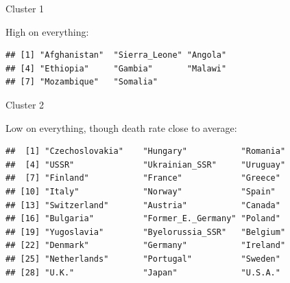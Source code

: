\begin{frame}[fragile]{Cluster 1}

    High on everything:

  
\begin{knitrout}
\color{fgcolor}\begin{kframe}
\begin{alltt}
\hlstd{(vital.s,country[clus6}\hlopt{==}\hlstd{])}
\end{alltt}
\begin{verbatim}
## [1] "Afghanistan"  "Sierra_Leone" "Angola"      
## [4] "Ethiopia"     "Gambia"       "Malawi"      
## [7] "Mozambique"   "Somalia"
\end{verbatim}
\end{kframe}
\end{knitrout}
  
\end{frame}
\begin{frame}[fragile]{Cluster 2}

  Low on everything, though death rate close to average:
  
\begin{knitrout}\small
{}\color{fgcolor}\begin{kframe}
\begin{alltt}
\hlstd{(vital.s,country[clus6}\hlopt{==}\hlstd{])}
\end{alltt}
\begin{verbatim}
##  [1] "Czechoslovakia"    "Hungary"           "Romania"          
##  [4] "USSR"              "Ukrainian_SSR"     "Uruguay"          
##  [7] "Finland"           "France"            "Greece"           
## [10] "Italy"             "Norway"            "Spain"            
## [13] "Switzerland"       "Austria"           "Canada"           
## [16] "Bulgaria"          "Former_E._Germany" "Poland"           
## [19] "Yugoslavia"        "Byelorussia_SSR"   "Belgium"          
## [22] "Denmark"           "Germany"           "Ireland"          
## [25] "Netherlands"       "Portugal"          "Sweden"           
## [28] "U.K."              "Japan"             "U.S.A."
\end{verbatim}
\end{kframe}
\end{knitrout}
  
\end{frame}
